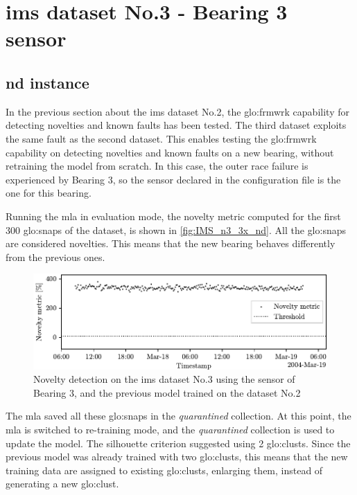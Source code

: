\section{\gls{ims} dataset No.3 - Bearing 3 sensor}
\label{sec:IMS_n3_3x}

\subsection{\gls{nd} instance}

In the previous section about the \gls{ims} dataset No.2, the \gls{glo:frmwrk} capability for detecting novelties and known faults has been tested. The third dataset exploits the same fault as the second dataset. This enables testing the \gls{glo:frmwrk} capability on detecting novelties and known faults on a new bearing, without retraining the model from scratch. In this case, the outer race failure is experienced by Bearing 3, so the sensor declared in the configuration file is the one for this bearing.

Running the \gls{mla} in evaluation mode, the novelty metric computed for the first 300 \gls{glo:snap}s of the dataset, is shown in \autoref{fig:IMS_n3_3x_nd}. All the \gls{glo:snap}s are considered novelties. This means that the new bearing behaves differently from the previous ones. 

\begin{figure}
    \centering
    \includegraphics{images/IMS/Test03/retrain.pdf}
    \caption{Novelty detection on the \gls{ims} dataset No.3 using the sensor of Bearing 3, and the previous model trained on the dataset No.2}
    \label{fig:IMS_n3_3x_nd}
\end{figure}

The \gls{mla} saved all these \gls{glo:snap}s in the \emph{quarantined} collection. At this point, the \gls{mla} is switched to re-training mode, and the \emph{quarantined} collection is used to update the model. The silhouette criterion suggested using 2 \gls{glo:clust}s. Since the previous model was already trained with two \gls{glo:clust}s, this means that the new training data are assigned to existing \gls{glo:clust}s, enlarging them, instead of generating a new \gls{glo:clust}. 

